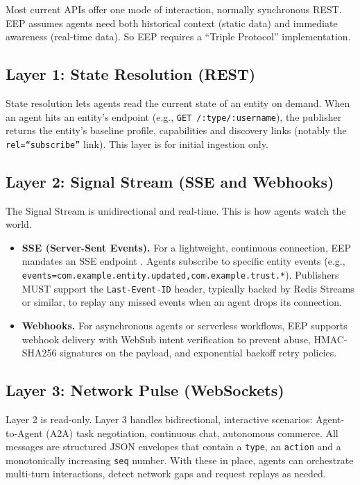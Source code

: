\documentclass[12pt,a4paper]{article}
\begin{document}
Most current APIs offer one mode of interaction, normally synchronous REST. EEP assumes agents need both historical context (static data) and immediate awareness (real-time data). So EEP requires a ``Triple Protocol'' implementation.

\subsection{Layer 1: State Resolution (REST)}
State resolution lets agents read the current state of an entity on demand. When an agent hits an entity's endpoint (e.g., \texttt{GET /:type/:username}), the publisher returns the entity's baseline profile, capabilities and discovery links (notably the \texttt{rel=``subscribe''} link). This layer is for initial ingestion only.

\subsection{Layer 2: Signal Stream (SSE and Webhooks)}
The Signal Stream is unidirectional and real-time. This is how agents watch the world.
\begin{itemize}
    \item \textbf{SSE (Server-Sent Events).} For a lightweight, continuous connection, EEP mandates an SSE endpoint \cite{ref21}. Agents subscribe to specific entity events (e.g., \texttt{events=com.example.entity.updated,com.example.trust.*}). Publishers MUST support the \texttt{Last-Event-ID} header, typically backed by Redis Streams or similar, to replay any missed events when an agent drops its connection.
    \item \textbf{Webhooks.} For asynchronous agents or serverless workflows, EEP supports webhook delivery with WebSub intent verification to prevent abuse, HMAC-SHA256 signatures on the payload, and exponential backoff retry policies.
\end{itemize}

\subsection{Layer 3: Network Pulse (WebSockets)}
Layer 2 is read-only. Layer 3 handles bidirectional, interactive scenarios: Agent-to-Agent (A2A) task negotiation, continuous chat, autonomous commerce. All messages are structured JSON envelopes that contain a \texttt{type}, an \texttt{action} and a monotonically increasing \texttt{seq} number. With these in place, agents can orchestrate multi-turn interactions, detect network gaps and request replays as needed.
\end{document}
